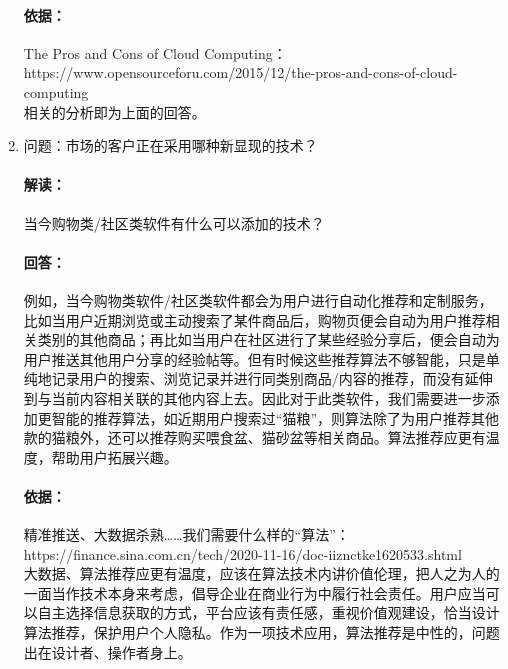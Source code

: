 \documentclass[a4paper]{ctexart}
\begin{document}
\begin{enumerate}[label=\alph*.]
  \paragraph{依据：}The Pros and Cons of Cloud Computing：\\https://www.opensourceforu.com/2015/12/the-pros-and-cons-of-cloud-computing\\
  相关的分析即为上面的回答。
  \item 问题：市场的客户正在采用哪种新显现的技术？
  \paragraph{解读：}当今购物类/社区类软件有什么可以添加的技术？
  \paragraph{回答：}例如，当今购物类软件/社区类软件都会为用户进行自动化推荐和定制服务，比如当用户近期浏览或主动搜索了某件商品后，购物页便会自动为用户推荐相关类别的其他商品；再比如当用户在社区进行了某些经验分享后，便会自动为用户推送其他用户分享的经验帖等。但有时候这些推荐算法不够智能，只是单纯地记录用户的搜索、浏览记录并进行同类别商品/内容的推荐，而没有延伸到与当前内容相关联的其他内容上去。因此对于此类软件，我们需要进一步添加更智能的推荐算法，如近期用户搜索过“猫粮”，则算法除了为用户推荐其他款的猫粮外，还可以推荐购买喂食盆、猫砂盆等相关商品。算法推荐应更有温度，帮助用户拓展兴趣。
  \paragraph{依据：}精准推送、大数据杀熟……我们需要什么样的“算法”：\\https://finance.sina.com.cn/tech/2020-11-16/doc-iiznctke1620533.shtml\\
  大数据、算法推荐应更有温度，应该在算法技术内讲价值伦理，把人之为人的一面当作技术本身来考虑，倡导企业在商业行为中履行社会责任。用户应当可以自主选择信息获取的方式，平台应该有责任感，重视价值观建设，恰当设计算法推荐，保护用户个人隐私。作为一项技术应用，算法推荐是中性的，问题出在设计者、操作者身上。
 \end{enumerate}
\end{document}
